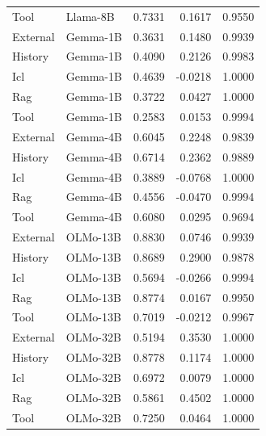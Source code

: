 \begin{tabular}{llrrr}
Tool & Llama-8B & 0.7331 & 0.1617 & 0.9550 \\
External & Gemma-1B & 0.3631 & 0.1480 & 0.9939 \\
History & Gemma-1B & 0.4090 & 0.2126 & 0.9983 \\
Icl & Gemma-1B & 0.4639 & -0.0218 & 1.0000 \\
Rag & Gemma-1B & 0.3722 & 0.0427 & 1.0000 \\
Tool & Gemma-1B & 0.2583 & 0.0153 & 0.9994 \\
External & Gemma-4B & 0.6045 & 0.2248 & 0.9839 \\
History & Gemma-4B & 0.6714 & 0.2362 & 0.9889 \\
Icl & Gemma-4B & 0.3889 & -0.0768 & 1.0000 \\
Rag & Gemma-4B & 0.4556 & -0.0470 & 0.9994 \\
Tool & Gemma-4B & 0.6080 & 0.0295 & 0.9694 \\
External & OLMo-13B & 0.8830 & 0.0746 & 0.9939 \\
History & OLMo-13B & 0.8689 & 0.2900 & 0.9878 \\
Icl & OLMo-13B & 0.5694 & -0.0266 & 0.9994 \\
Rag & OLMo-13B & 0.8774 & 0.0167 & 0.9950 \\
Tool & OLMo-13B & 0.7019 & -0.0212 & 0.9967 \\
External & OLMo-32B & 0.5194 & 0.3530 & 1.0000 \\
History & OLMo-32B & 0.8778 & 0.1174 & 1.0000 \\
Icl & OLMo-32B & 0.6972 & 0.0079 & 1.0000 \\
Rag & OLMo-32B & 0.5861 & 0.4502 & 1.0000 \\
Tool & OLMo-32B & 0.7250 & 0.0464 & 1.0000 \\
\bottomrule
\end{tabular}
